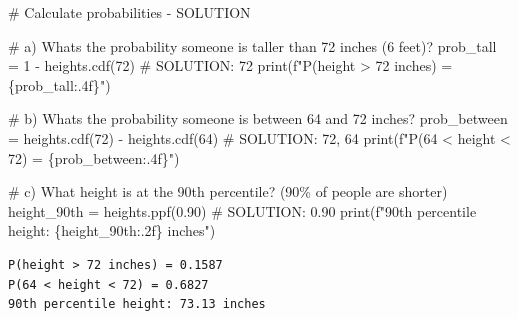 \documentclass[
  letterpaper,
  DIV=11,
  numbers=noendperiod]{scrartcl}
\newenvironment{Shaded}{\begin{snugshade}}{\end{snugshade}}
\newcommand{\BuiltInTok}[1]{\textcolor[rgb]{0.00,0.23,0.31}{#1}}
\newcommand{\CommentTok}[1]{\textcolor[rgb]{0.37,0.37,0.37}{#1}}
\newcommand{\DecValTok}[1]{\textcolor[rgb]{0.68,0.00,0.00}{#1}}
\newcommand{\FloatTok}[1]{\textcolor[rgb]{0.68,0.00,0.00}{#1}}
\newcommand{\NormalTok}[1]{\textcolor[rgb]{0.00,0.23,0.31}{#1}}
\newcommand{\OperatorTok}[1]{\textcolor[rgb]{0.37,0.37,0.37}{#1}}
\newcommand{\SpecialCharTok}[1]{\textcolor[rgb]{0.37,0.37,0.37}{#1}}
\newcommand{\SpecialStringTok}[1]{\textcolor[rgb]{0.13,0.47,0.30}{#1}}
\begin{document}
\begin{Shaded}
\begin{Highlighting}[]
\CommentTok{\# Calculate probabilities {-} SOLUTION}

\CommentTok{\# a) What\textquotesingle{}s the probability someone is taller than 72 inches (6 feet)?}
\NormalTok{prob\_tall }\OperatorTok{=} \DecValTok{1} \OperatorTok{{-}}\NormalTok{ heights.cdf(}\DecValTok{72}\NormalTok{)  }\CommentTok{\# SOLUTION: 72}
\BuiltInTok{print}\NormalTok{(}\SpecialStringTok{f"P(height \textgreater{} 72 inches) = }\SpecialCharTok{\{}\NormalTok{prob\_tall}\SpecialCharTok{:.4f\}}\SpecialStringTok{"}\NormalTok{)}

\CommentTok{\# b) What\textquotesingle{}s the probability someone is between 64 and 72 inches?}
\NormalTok{prob\_between }\OperatorTok{=}\NormalTok{ heights.cdf(}\DecValTok{72}\NormalTok{) }\OperatorTok{{-}}\NormalTok{ heights.cdf(}\DecValTok{64}\NormalTok{)  }\CommentTok{\# SOLUTION: 72, 64}
\BuiltInTok{print}\NormalTok{(}\SpecialStringTok{f"P(64 \textless{} height \textless{} 72) = }\SpecialCharTok{\{}\NormalTok{prob\_between}\SpecialCharTok{:.4f\}}\SpecialStringTok{"}\NormalTok{)}

\CommentTok{\# c) What height is at the 90th percentile? (90\% of people are shorter)}
\NormalTok{height\_90th }\OperatorTok{=}\NormalTok{ heights.ppf(}\FloatTok{0.90}\NormalTok{)  }\CommentTok{\# SOLUTION: 0.90}
\BuiltInTok{print}\NormalTok{(}\SpecialStringTok{f"90th percentile height: }\SpecialCharTok{\{}\NormalTok{height\_90th}\SpecialCharTok{:.2f\}}\SpecialStringTok{ inches"}\NormalTok{)}
\end{Highlighting}
\end{Shaded}

\begin{verbatim}
P(height > 72 inches) = 0.1587
P(64 < height < 72) = 0.6827
90th percentile height: 73.13 inches
\end{verbatim}
\end{document}

